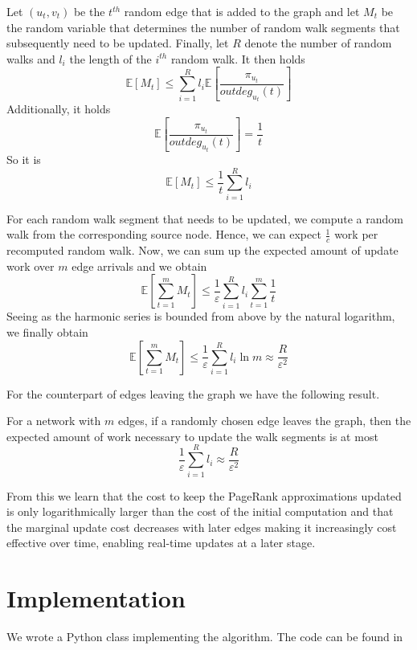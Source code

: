 \documentclass[sigconf]{acmart}
\theoremstyle{definition}
\begin{document}
\begin{theorem}
Let $(u_t, v_t)$ be the $t^{th}$ random edge that is added to the graph and let $M_t$ be the random variable that determines the number of random walk segments that subsequently need to be updated. Finally, let $R$ denote the number of random walks and $l_i$ the length of the $i^{th}$ random walk. It then holds 
\[
\mathbb{E}[M_t] \leq \sum_{i=1}^{R}l_i\mathbb{E}[\frac{\pi_{u_t}}{outdeg_{u_t}(t)}] 
\]
Additionally, it holds 
\[
\mathbb{E}[\frac{\pi_{u_t}}{outdeg_{u_t}(t)}] = \frac{1}{t} 
\]
So it is
\[
\mathbb{E}[M_t] \leq \frac{1}{t}\sum_{i=1}^{R}l_i 
\]

\noindent For each random walk segment that needs to be updated, we compute a random walk from the corresponding source node. Hence, we can expect $\frac{1}{c}$ work per recomputed random walk. Now, we can sum up the expected amount of update work over $m$ edge arrivals and we obtain
\[
\mathbb{E}[\sum_{t=1}^{m}M_t] \leq \frac{1}{\varepsilon}\sum_{i=1}^{R}l_i \sum_{t=1}^{m}\frac{1}{t}
\]
Seeing as the harmonic series is bounded from above by the natural logarithm, we finally obtain
\[
\mathbb{E}[\sum_{t=1}^{m}M_t]\leq\frac{1}{\varepsilon}\sum_{i=1}^{R}l_i \ln{m} \approx \frac{R}{\varepsilon^2}
\]
\end{theorem}
For the counterpart of edges leaving the graph we have the following result.
\begin{theorem}
\noindent For a network with $m$ edges, if a randomly chosen edge leaves the graph, then the expected amount of work necessary to update the walk segments is at most
\[
\frac{1}{\varepsilon}\sum_{i=1}^{R}l_i\approx\frac{R}{\varepsilon^2}
\]
\end{theorem}
\noindent From this we learn that the cost to keep the PageRank approximations updated is only logarithmically larger than the cost of the initial computation and that the marginal update cost decreases with later edges making it increasingly cost effective over time, enabling real-time updates at a later stage.

\section{Implementation}
\label{sec:Implementation}
We wrote a Python class implementing the algorithm. The code can be found in \\
\end{document}
